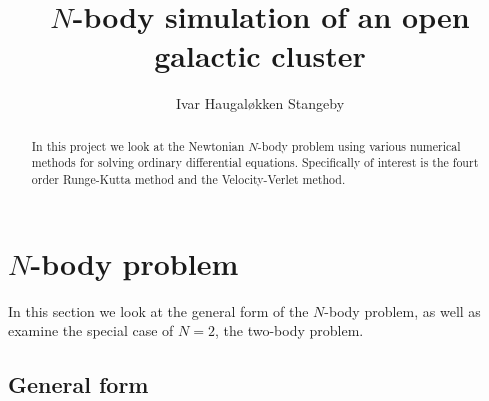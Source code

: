 \documentclass[a4paper, 11pt]{article}
\title{$N$-body simulation of an open galactic cluster}
\author{Ivar Haugal{\o}kken Stangeby}
\begin{document}
\maketitle
\begin{abstract}
    In this project we look at the Newtonian $N$-body problem using various
    numerical methods for solving ordinary differential equations. Specifically
    of interest is the fourt order Runge-Kutta method and the Velocity-Verlet
    method.
\end{abstract}

\tableofcontents

\section{$N$-body problem}
\label{sec:_n_body_problem}

In this section we look at the general form of the $N$-body problem, as well as
examine the special case of $N = 2$, the two-body problem.

\subsection{General form}
\label{sub:general_form}
\end{document}
